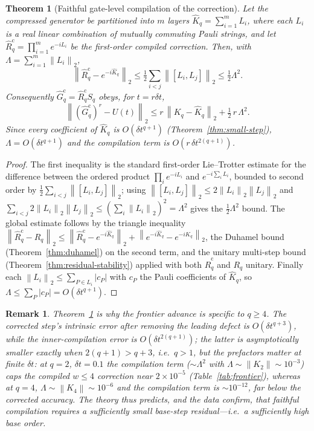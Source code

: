 \documentclass[aps,prresearch,reprint,superscriptaddress,nofootinbib,amsmath,amssymb]{revtex4-2}
\newcommand{\norm}[1]{\left\lVert #1 \right\rVert}
\newcommand{\abs}[1]{\left\lvert #1 \right\rvert}
\newcommand{\dt}{\delta t}
\newtheorem{theorem}{Theorem}
\newtheorem{remark}{Remark}
\begin{document}
\begin{theorem}[Faithful gate-level compilation of the correction]
\label{thm:faithful-compilation}
Let the compressed generator be partitioned into $m$ layers $\widehat K_q=\sum_{i=1}^{m}L_i$, where each $L_i$ is a real linear combination of \emph{mutually commuting} Pauli strings, and let $\widehat R_q^{\mathrm{c}}=\prod_{i=1}^{m}e^{-iL_i}$ be the first-order compiled correction. Then, with $\Lambda=\sum_{i=1}^{m}\norm{L_i}_2$,
\begin{equation}
    \norm{\widehat R_q^{\mathrm{c}}-e^{-i\widehat K_q}}_2\le\tfrac12\sum_{i<j}\norm{[L_i,L_j]}_2\le\tfrac12\Lambda^2 .
\end{equation}
Consequently $\widehat G_q^{\mathrm{c}}=\widehat R_q^{\mathrm{c}}S_q$ obeys, for $t=r\dt$,
\begin{equation}
    \norm{(\widehat G_q^{\mathrm{c}})^{r}-U(t)}_2\le r\,\norm{K_q-\widehat K_q}_2+\tfrac12\,r\,\Lambda^2 .
\end{equation}
Since every coefficient of $\widehat K_q$ is $O(\dt^{q+1})$ (Theorem~\ref{thm:small-step}), $\Lambda=O(\dt^{q+1})$ and the compilation term is $O(r\,\dt^{2(q+1)})$.
\end{theorem}

\begin{proof}
The first inequality is the standard first-order Lie--Trotter estimate for the difference between the ordered product $\prod_i e^{-iL_i}$ and $e^{-i\sum_i L_i}$, bounded to second order by $\tfrac12\sum_{i<j}\norm{[L_i,L_j]}_2$; using $\norm{[L_i,L_j]}_2\le2\norm{L_i}_2\norm{L_j}_2$ and $\sum_{i<j}2\norm{L_i}_2\norm{L_j}_2\le(\sum_i\norm{L_i}_2)^2=\Lambda^2$ gives the $\tfrac12\Lambda^2$ bound. The global estimate follows by the triangle inequality $\norm{\widehat R_q^{\mathrm{c}}-R_q}_2\le\norm{\widehat R_q^{\mathrm{c}}-e^{-i\widehat K_q}}_2+\norm{e^{-i\widehat K_q}-e^{-iK_q}}_2$, the Duhamel bound (Theorem~\ref{thm:duhamel}) on the second term, and the unitary multi-step bound (Theorem~\ref{thm:residual-stability}) applied with both $\widehat R_q^{\mathrm{c}}$ and $R_q$ unitary. Finally each $\norm{L_i}_2\le\sum_{P\in L_i}\abs{c_P}$ with $c_P$ the Pauli coefficients of $\widehat K_q$, so $\Lambda\le\sum_P\abs{c_P}=O(\dt^{q+1})$.
\end{proof}

\begin{remark}
Theorem~\ref{thm:faithful-compilation} is why the frontier advance is specific to $q\ge4$. The corrected step's intrinsic error after removing the leading defect is $O(\dt^{q+3})$, while the inner-compilation error is $O(\dt^{2(q+1)})$; the latter is asymptotically smaller exactly when $2(q+1)>q+3$, i.e.\ $q>1$, but the \emph{prefactors} matter at finite $\dt$: at $q=2$, $\dt=0.1$ the compilation term ($\sim\Lambda^2$ with $\Lambda\sim\norm{K_2}\sim10^{-3}$) caps the compiled $w\le4$ correction near $2\times10^{-5}$ (Table~\ref{tab:frontier}), whereas at $q=4$, $\Lambda\sim\norm{K_4}\sim10^{-6}$ and the compilation term is $\sim10^{-12}$, far below the corrected accuracy. The theory thus predicts, and the data confirm, that faithful compilation requires a sufficiently small base-step residual---i.e.\ a sufficiently high base order.
\end{remark}
\end{document}
